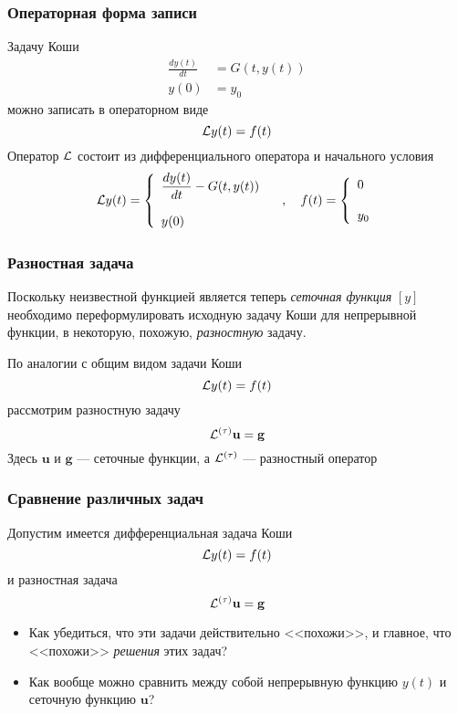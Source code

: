 \documentclass[apectratio=43,unicode]{beamer}
\begin{document}
\begin{frame}\frametitle{Операторная форма записи}
	Задачу Коши
	\begin{align*}
	\frac{dy(t)}{dt} &= G(t, y(t))\\
	y(0) &= y_0
	\end{align*}
	можно записать в операторном виде
	$$
	\mathcal{L} y(t) = f(t)
	$$
	Оператор $\mathcal{L}$ состоит из дифференциального оператора и начального условия
	$$
	\mathcal{L} y(t) = \left\{
	\begin{array}{l}
		\displaystyle \frac{dy(t)}{dt} - G(t, y(t))\\
		\\
		y(0)
	\end{array}
	\right.
	\quad,\quad
	f(t) = \left\{
	\begin{array}{l}
		0\\
		\\
		y_0
	\end{array}
	\right.	
	$$
\end{frame}

\def\Lh{{\L^{(\tau)}}}
\begin{frame}\frametitle{Разностная задача}
	Поскольку неизвестной функцией является теперь \emph{сеточная функция} $[y]$ необходимо переформулировать исходную задачу 
	Коши для непрерывной функции, в некоторую, похожую, \emph{разностную} задачу.
	\pause

	По аналогии с общим видом задачи Коши
	$$
	\mathcal{L} y(t) = f(t)
	$$
	рассмотрим разностную задачу
	$$
	\Lh \mathbf{u} = \mathbf{g}
	$$
	Здесь $\mathbf{u}$ и $\mathbf{g}$ --- сеточные функции, а $\Lh$ --- разностный оператор
\end{frame}

\frametitle{Сравнение различных задач}
\begin{frame}
	Допустим имеется дифференциальная задача Коши
	$$
	\mathcal{L} y(t) = f(t)
	$$
	и разностная задача
	$$
	\Lh \mathbf{u} = \mathbf{g}
	$$
	\begin{itemize}
	\item Как убедиться, что эти задачи действительно <<похожи>>, и главное, что
<<похожи>> \emph{решения} этих задач?
	\pause

	\item Как вообще можно сравнить между собой непрерывную функцию $y(t)$ и сеточную функцию $\mathbf{u}$?
	\end{itemize}
\end{frame}
\end{document}
